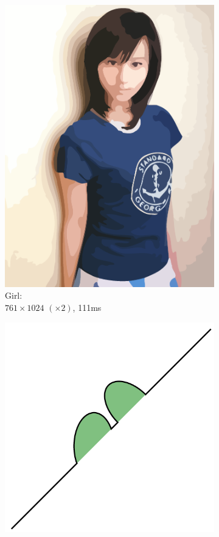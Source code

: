 \documentclass[UTF8]{ctexart}
\begin{document}
\begin{figure}[H]
\begin{subfigure}[b]{0.3\textwidth}
        \includegraphics[width=\textwidth]{images/Girl-761x1024-x2-111ms.png}
        \caption{Girl: \\$761 \times 1024$ $(\times 2)$, 111ms}
    \end{subfigure}
    \par\bigskip
    \begin{subfigure}[b]{0.4\textwidth}
        \centering
        \includegraphics[width=\textwidth]{images/Arcs-1024x1024-x2-19ms.png}

\end{subfigure}
\end{figure}
\end{document}
